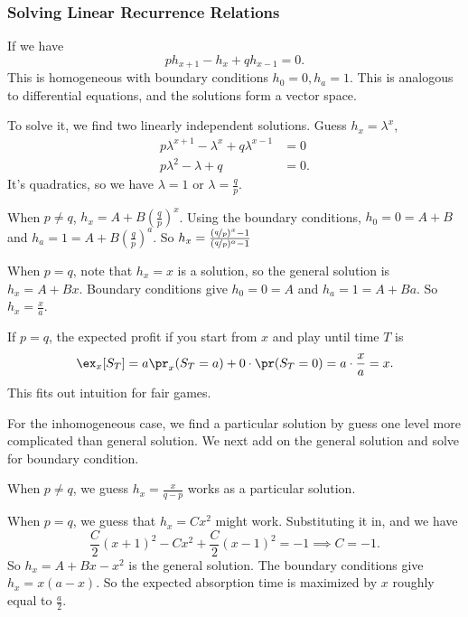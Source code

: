 \subsubsection*{Solving Linear Recurrence Relations}
If we have
\[
    ph_{x+1} - h_x + qh_{x-1}=0.
\]
This is homogeneous with boundary conditions \(h_0 = 0, h_a = 1\). This is analogous to differential equations, and the solutions form a vector space.

To solve it, we find two linearly independent solutions. Guess \(h_x = \lambda^x\),
\begin{align*}
    p\lambda^{x + 1} - \lambda^x + q\lambda^{x - 1} &= 0\\
    p\lambda^2 - \lambda + q &= 0.
\end{align*}
It's quadratics, so we have \(\lambda = 1\) or \(\lambda = \frac{q}{p}\).

When \(p \neq q\), \(h_x = A + B(\frac{q}{p})^x\). Using the boundary conditions, \(h_0 = 0 = A + B\) and \(h_a = 1 = A + B(\frac{q}{p})^a\). So \(h_x = \frac{(\nicefrac{q}{p})^x - 1}{(\nicefrac{q}{p})^a - 1}\)

When \(p = q\), note that \(h_x = x\) is a solution, so the general solution is \(h_x = A + Bx\). Boundary conditions give \(h_0 = 0 = A\) and \(h_a = 1 = A + Ba\). So \(h_x = \frac{x}{a}\).

If \(p = q\), the expected profit if you start from \(x\) and play until time \(T\) is
\[
    \ex_x[S_T] = a\pr_x(S_T = a) + 0 \cdot\pr(S_T = 0) = a \cdot \frac{x}{a} = x.
\]
This fits out intuition for fair games.

For the inhomogeneous case, we find a particular solution by guess one level more complicated than general solution. We next add on the general solution and solve for boundary condition.

When \(p \neq q\), we guess \(h_x = \frac{x}{q - p}\) works as a particular solution.

When \(p = q\), we guess that \(h_x = Cx^2\) might work. Substituting it in, and we have
\[
    \frac{C}{2}(x+1)^2 - Cx^2 +\frac{C}{2}(x-1)^2 = -1 \implies C = -1.
\]
So \(h_x = A + Bx - x^2\) is the general solution. The boundary conditions give \(h_x = x(a - x)\). So the expected absorption time is maximized by \(x\) roughly equal to \(\frac{a}{2}\).